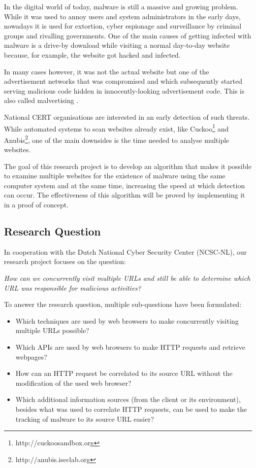 In the digital world of today, malware is still a massive and growing problem. While it was used to annoy users and system administrators in the early days, nowadays it is used for extortion, cyber espionage and surveillance by criminal groups and rivalling governments. One of the main causes of getting infected with malware is a drive-by download while visiting a normal day-to-day website because, for example, the website got hacked and infected. 

In many cases \cite{proofpoint,foxittelegraaf,foxityahoo} however, it was not the actual website but one of the advertisement networks that was compromised and which subsequently started serving malicious code hidden in innocently-looking advertisement code. This is also called malvertising \cite{Li2012}.

National CERT organisations are interested in an early detection of such threats. While automated systems to scan websites already exist, like Cuckoo\footnote{http://cuckoosandbox.org} and Anubis\footnote{http://anubis.iseclab.org}, one of the main downsides is the time needed to analyse multiple websites.

The goal of this research project is to develop an algorithm that makes it possible to examine multiple websites for the existence of malware using the same computer system and at the same time, increasing the speed at which detection can occur. The effectiveness of this algorithm will be proved by implementing it in a proof of concept.

\subsection{Research Question}

In cooperation with the Dutch National Cyber Security Center (NCSC-NL), our research project focuses on the question:

\textit{How can we concurrently visit multiple URLs and still be able to determine which URL was responsible for malicious activities?}

To answer the research question, multiple sub-questions have been formulated:

\begin{itemize}
\item Which techniques are used by web browsers to make concurrently visiting multiple URLs possible?
\item Which APIs are used by web browsers to make HTTP requests and retrieve webpages?
\item How can an HTTP request be correlated to its source URL without the modification of the used web browser?
\item Which additional information sources (from the client or its environment), besides what was used to correlate HTTP requests, can be used to make the tracking of malware to its source URL easier?
\end{itemize}

